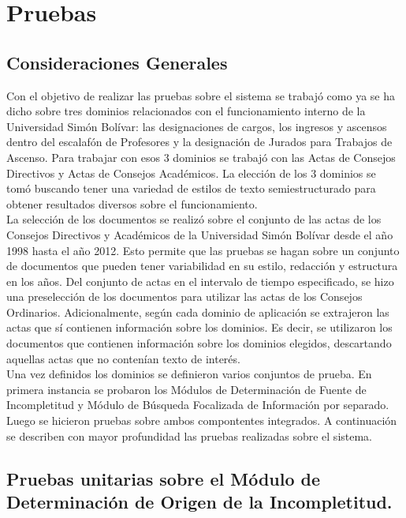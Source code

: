 \chapter{Pruebas} \label{chap:pruebas}

\section{Consideraciones Generales} 

Con el objetivo de realizar las pruebas sobre el sistema se trabajó como ya se ha dicho sobre tres dominios relacionados con el funcionamiento interno de la Universidad Simón Bolívar: las designaciones de cargos, los ingresos y ascensos dentro del escalafón de Profesores y la designación de Jurados para Trabajos de Ascenso. Para trabajar con esos 3 dominios se trabajó con las Actas de Consejos Directivos y Actas de Consejos Académicos. La elección de los 3 dominios se tomó buscando tener una variedad de estilos de texto semiestructurado para obtener resultados diversos sobre el funcionamiento. \\

La selección de los documentos se realizó sobre el conjunto de las actas de los Consejos Directivos y Académicos de la Universidad Simón Bolívar desde el año 1998 hasta el año 2012. Esto permite que las pruebas se hagan sobre un conjunto de documentos que pueden tener variabilidad en su estilo, redacción y estructura en los años. Del conjunto de actas en el intervalo de tiempo especificado, se hizo una preselección de los documentos para utilizar las actas de los Consejos Ordinarios. Adicionalmente, según cada dominio de aplicación se extrajeron las actas que sí contienen información sobre los dominios. Es decir, se utilizaron los documentos que contienen información sobre los dominios elegidos, descartando aquellas actas que no contenían texto de interés.\\

Una vez definidos los dominios se definieron varios conjuntos de prueba. En primera instancia se probaron los Módulos de Determinación de Fuente de Incompletitud y Módulo de Búsqueda Focalizada de Información por separado. Luego se hicieron pruebas sobre ambos compontentes integrados. A continuación se describen con mayor profundidad las pruebas realizadas sobre el sistema. \\

\section{Pruebas unitarias sobre el Módulo de Determinación de Origen de la Incompletitud.} 

